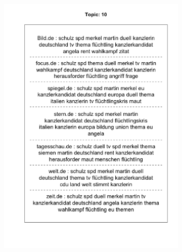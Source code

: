 \documentclass[12pt,a4paper,notitlepage]{article}
\begin{document}
\begin{figure}[H]
\begin{center}
\begin{subfigure}[normla]{0.49\textwidth}
			\includegraphics[width=\textwidth]{figs/plotquote10.png}
		\end{subfigure}
	\end{center}
\end{figure}
\end{document}
